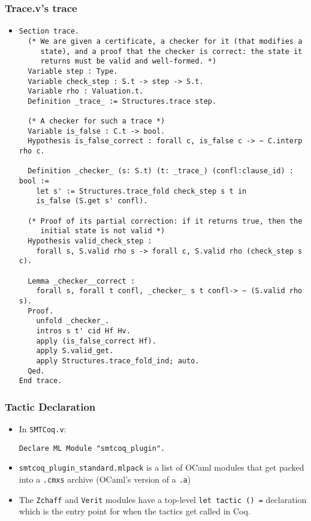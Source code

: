 \documentclass{beamer}
\begin{document}
\begin{frame}[fragile]
\frametitle{Trace.v's trace}
\begin{itemize}
\item
\begin{Verbatim}[fontsize=\tiny]
Section trace.
  (* We are given a certificate, a checker for it (that modifies a
     state), and a proof that the checker is correct: the state it
     returns must be valid and well-formed. *)
  Variable step : Type.
  Variable check_step : S.t -> step -> S.t.
  Variable rho : Valuation.t.
  Definition _trace_ := Structures.trace step.

  (* A checker for such a trace *)
  Variable is_false : C.t -> bool.
  Hypothesis is_false_correct : forall c, is_false c -> ~ C.interp rho c.
 
  Definition _checker_ (s: S.t) (t: _trace_) (confl:clause_id) : bool :=
    let s' := Structures.trace_fold check_step s t in
    is_false (S.get s' confl).

  (* Proof of its partial correction: if it returns true, then the
     initial state is not valid *)
  Hypothesis valid_check_step :
    forall s, S.valid rho s -> forall c, S.valid rho (check_step s c).

  Lemma _checker__correct :
    forall s, forall t confl, _checker_ s t confl-> ~ (S.valid rho s).
  Proof.
    unfold _checker_.
    intros s t' cid Hf Hv.
    apply (is_false_correct Hf).
    apply S.valid_get.
    apply Structures.trace_fold_ind; auto.
  Qed.
End trace.
\end{Verbatim}
\end{itemize}
\end{frame}

\begin{frame}[fragile]
\frametitle{Tactic Declaration}
\begin{itemize}
\item In \verb|SMTCoq.v|:
\begin{Verbatim}[fontsize=\small]
Declare ML Module "smtcoq_plugin".
\end{Verbatim}
\item \verb|smtcoq_plugin_standard.mlpack| is a list of OCaml modules that get packed into a \verb|.cmxs| archive (OCaml's version of a \verb|.a|)
\item The \verb|Zchaff| and \verb|Verit| modules have a top-level \verb|let tactic () =| declaration which is the entry point for when the tactics get called in Coq.
\end{itemize}
\end{frame}
\end{document}
